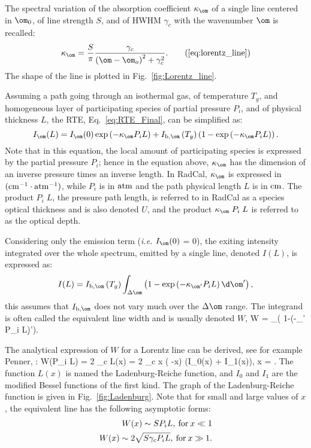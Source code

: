 The spectral variation of the absorption coefficient $\kappa_{\om}$ of a single line centered in $\om_0$, of line strength $S$, and of HWHM $\gamma_c$ with the wavenumber $\om$ is recalled:
\begin{equation}
 \kappa_{\om} = \dfrac{S}{\pi}\dfrac{\gamma_c}{\left( \om - \om_o\right)^2 + \gamma_c^2}. \tag{\ref{eq:lorentz_line}}
\end{equation}
The shape of the line is plotted in Fig.~\ref{fig:Lorentz_line}.

Assuming a path going through an isothermal gas, of temperature $T_g$, and homogeneous layer of participating species of partial pressure $P_i$, and of physical thickness $L$, the RTE, Eq.~\ref{eq:RTE_Final}, can be simplified as:
\begin{equation}
 I_{\om}(L) =  I_{\om}(0) \exp\left( -\kappa_{\om} P_i L\right) + I_{\rm b,\om}\left(T_g\right) \left(1-\exp\left(-\kappa_{\om} P_i L\right)\right).
\end{equation}
Note that in this equation, the local amount of participating species is expressed by the partial pressure $P_i$; hence in the equation above, $\kappa_{\om}$ has the dimension of an inverse pressure times an inverse length. In RadCal, $\kappa_{\om}$ is expressed in $\rm (cm^{-1} \cdot atm^{-1})$, while $P_i$ is in $\rm atm$ and the path physical length $L$ is in $\rm cm$. The product $P_i\;L$, the pressure path length, is referred to in RadCal as a species optical thickness and is also denoted $U$, and the product $\kappa_{\om}\;P_i\;L$ is referred to as the optical depth.

Considering only the emission term (\textit{i.e.} $I_{\om}(0)$ = 0), the exiting intensity integrated over the whole spectrum, emitted by a single line, denoted $I(L)$, is expressed as:
\begin{equation}
I(L) =  I_{\rm b,\om}\left(T_g\right) \displaystyle\int_{\Delta \om}\left( 1-\exp\left(-\kappa_{\om'} P_i L\right)\d \om'\right),
\end{equation}
this assumes that $I_{\rm b,\om}$ does not vary much over the $\Delta \om$ range. The integrand is often called the equivalent line width \cite{Modest2013} and is usually denoted $W$,
\be
W = \displaystyle\int_{\Delta \om}\left( 1-\exp\left(-\kappa_{\om'} P_i L\right)\d \om'\right).
\ee

The analytical expression of $W$ for a Lorentz line can be derived, see for example Penner, \cite{Penner1959}:
\be
W(P_i L) = 2 \pi \gamma_c L(x) = 2  \pi \gamma_c x \;\exp\left( -x\right) \left(I_0(x) + I_1(x)\right), \; x = .
\ee
The function $L(x)$ is named the Ladenburg-Reiche function, and $I_0$ and $I_1$ are the modified Bessel functions of the first kind. The graph of the Ladenburg-Reiche function is
given in Fig.~\ref{fig:Ladenburg}. Note that for small and large values of $x$, the equivalent line has the following asymptotic forms:
\begin{align}
W(x) \sim SP_iL ,\: {\rm for}\: x \ll 1 \\
W(x) \sim 2\sqrt{S\gamma_c P_iL} ,\: {\rm for}\: x \gg 1.
\end{align}

